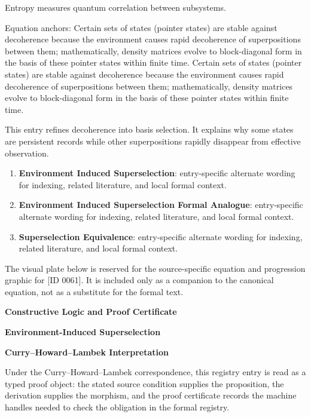 Entropy measures quantum correlation between subsystems.

Equation anchors: Certain sets of states (pointer states) are stable against decoherence because the environment causes rapid decoherence of superpositions between them; mathematically, density matrices evolve to block-diagonal form in the basis of these pointer states within finite time. Certain sets of states (pointer states) are stable against decoherence because the environment causes rapid decoherence of superpositions between them; mathematically, density matrices evolve to block-diagonal form in the basis of these pointer states within finite time.

This entry refines decoherence into basis selection. It explains why some states are persistent records while other superpositions rapidly disappear from effective observation.
\endgroup

\begingroup\footnotesize\sloppy
\begin{enumerate}[leftmargin=1.35em,itemsep=1pt,topsep=1pt,parsep=0pt]
\item \textbf{Environment Induced Superselection}: entry-specific alternate wording for indexing, related literature, and local formal context.
\item \textbf{Environment Induced Superselection Formal Analogue}: entry-specific alternate wording for indexing, related literature, and local formal context.
\item \textbf{Superselection Equivalence}: entry-specific alternate wording for indexing, related literature, and local formal context.
\end{enumerate}
\endgroup

\begingroup\footnotesize\sloppy
The visual plate below is reserved for the source-specific equation and progression graphic for [ID 0061]. It is included only as a companion to the canonical equation, not as a substitute for the formal text.
\par\endgroup
\ifTZPDarkEdition
{}
\fi

\clearpage
\begingroup\tzpsupportsetup
\noindent\textbf{\fontsize{10.8pt}{12.8pt}\selectfont [ID 0061] Constructive Logic and Proof Certificate}\par
\noindent\textbf{\fontsize{10pt}{12pt}\selectfont Environment-Induced Superselection}\par
\vspace{0.45em}
\begingroup
\footnotesize
\setlength{\parskip}{0.22em}
\setlength{\parindent}{0pt}
\noindent\textbf{Curry--Howard--Lambek Interpretation}\par
Under the Curry--Howard--Lambek correspondence, this registry entry is read as a typed proof
object: the stated source condition supplies the proposition, the derivation supplies the
morphism, and the proof certificate records the machine handles needed to check the obligation
in the formal registry.

